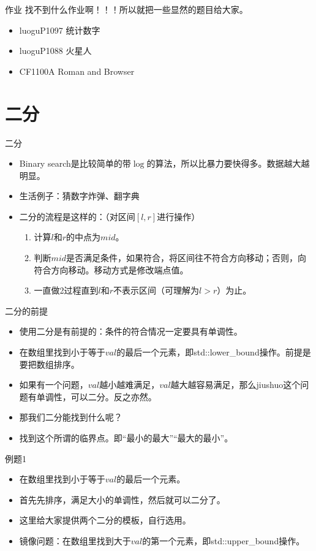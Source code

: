 \documentclass{beamer}[UTF-8]
\begin{document}
\begin{frame}{作业}
 \pause
找不到什么作业啊！！！所以就把一些显然的题目给大家。 \pause
\begin{itemize}
\item luoguP1097 统计数字 \pause
\item luoguP1088 火星人 \pause
\item CF1100A Roman and Browser \pause
\end{itemize}
\end{frame}
\section{二分} %
\begin{frame}{二分}
 \pause
\begin{itemize}
\item Binary search是比较简单的带$\log$的算法，所以比暴力要快得多。数据越大越明显。 \pause
\item 生活例子：猜数字炸弹、翻字典 \pause
\item 二分的流程是这样的：（对区间$[l,r]$进行操作） \pause
\begin{enumerate}
\item 计算$l$和$r$的中点为$mid$。 \pause
\item 判断$mid$是否满足条件，如果符合，将区间往不符合方向移动；否则，向符合方向移动。移动方式是修改端点值。 \pause
\item 一直做2过程直到$l$和$r$不表示区间（可理解为$l>r$）为止。
\end{enumerate}
\end{itemize}
\end{frame}

\begin{frame}{二分的前提}
 \pause
\begin{itemize}
\item 使用二分是有前提的：条件的符合情况一定要具有单调性。 \pause
\item 在数组里找到小于等于$val$的最后一个元素，即std::lower\_bound操作。前提是要把数组排序。 \pause
\item 如果有一个问题，$val$越小越难满足，$val$越大越容易满足，那么jiushuo这个问题有单调性，可以二分。反之亦然。 \pause
\item 那我们二分能找到什么呢？ \pause
\item 找到这个所谓的临界点。即“最小的最大”“最大的最小”。
\end{itemize}
\end{frame}

\begin{frame}{例题1}
 \pause
\begin{itemize}
\item 在数组里找到小于等于$val$的最后一个元素。 \pause
\item 首先先排序，满足大小的单调性，然后就可以二分了。 \pause
\item 这里给大家提供两个二分的模板，自行选用。 \pause
\item 镜像问题：在数组里找到大于$val$的第一个元素，即std::upper\_bound操作。
\end{itemize}
\end{frame}
\end{document}
